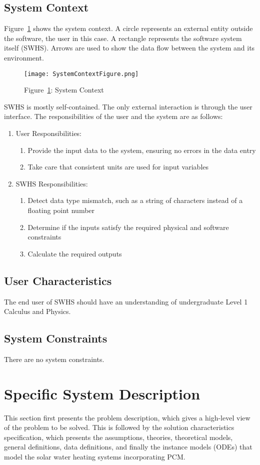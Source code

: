 \documentclass[12pt]{article}
\begin{document}
\subsection{System Context}
\label{Sec:SystCont}
Figure~\ref{Figure::SystCont} shows the system context. A circle represents an external entity outside the software, the user in this case. A rectangle represents the software system itself (SWHS). Arrows are used to show the data flow between the system and its environment.
\begin{figure}
\begin{center}
\texttt{[image: SystemContextFigure.png]}
\caption{Figure~\ref{Figure::SystCont}: System Context}
\label{Figure::SystCont}
\end{center}
\end{figure}
SWHS is mostly self-contained. The only external interaction is through the user interface. The responsibilities of the user and the system are as follows:
\begin{enumerate}
\item{User Responsibilities:}
\begin{enumerate}
\item{Provide the input data to the system, ensuring no errors in the data entry}
\item{Take care that consistent units are used for input variables}
\end{enumerate}
\item{SWHS Responsibilities:}
\begin{enumerate}
\item{Detect data type mismatch, such as a string of characters instead of a floating point number}
\item{Determine if the inputs satisfy the required physical and software constraints}
\item{Calculate the required outputs}
\end{enumerate}
\end{enumerate}
\subsection{User Characteristics}
\label{Sec:UserChar}
The end user of SWHS should have an understanding of undergraduate Level 1 Calculus and Physics.
\subsection{System Constraints}
\label{Sec:SystCons}
There are no system constraints.
\section{Specific System Description}
\label{Sec:SpecSystDesc}
This section first presents the problem description, which gives a high-level view of the problem to be solved. This is followed by the solution characteristics specification, which presents the assumptions, theories, theoretical models, general definitions, data definitions, and finally the instance models (ODEs) that model the solar water heating systems incorporating PCM.
\end{document}
